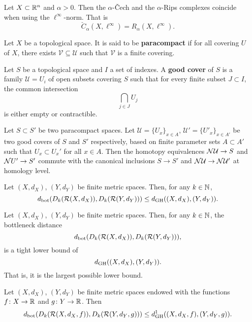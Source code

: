\begin{lemma}
    Let $ X \subset \mathbb R^n $ and $ \alpha > 0 $. Then the $\alpha$-\v Cech and the $\alpha$-Rips complexes coincide when using the $ \ell^\infty $-norm. That is
    $$
        \check C_\alpha(X, \ell^\infty) = R_\alpha(X, \ell^\infty).
    $$
\end{lemma}

\begin{definition}
    Let $ X $ be a topological space. It is said to be {\bf paracompact} if for all covering $ U $ of $ X $, there exists $ \mathcal V \subseteq \mathcal U $ such that $ \mathcal V $ is a finite covering.
\end{definition}

\begin{definition}
    Let $ S $ be a topological space and $ I $ a set of indexes. A {\bf good cover} of $ S $ is a family $ \mathcal U = {U_i} $ of open subsets covering $ S $ such that for every finite subset $ J \subset I $, the common intersection
    \begin{equation}
        \bigcap_{j\in J} U_j
    \end{equation}
    is either empty or contractible.
\end{definition}

\begin{lemma}
    Let $ S \subset S' $ be two paracompact spaces. Let $ \mathcal U = \{U_x\}_{x \in A}$, $ \mathcal U' = \{U'_x\}_{x \in A'}$ be two good covers of $ S $ and $ S'$ respectively, based on finite parameter sets $ A \subset A ' $ such that $ U_x \subset U_x' $ for all $ x \in A $. Then the homotopy equivalences $ \mathcal{N} \mathcal U \to S $ and $\mathcal{N} U' \to S' $ commute with the canonical inclusions $ S \to S' $ and $ \mathcal{N} \mathcal U \to \mathcal{N} \mathcal U' $ at homology level.
\end{lemma}

\begin{theorem}
    Let $ (X, d_X) $, $ (Y, d_Y) $ be finite metric spaces. Then, for any $ k \in \mathbb N$, 
    $$
        d_{\operatorname{bot}}(D_k(\mathcal{R}(X, d_X)), D_k(\mathcal{R}(Y, d_Y))) \leq d_{\operatorname{GH}}((X, d_X), (Y, d_Y)).
    $$
\end{theorem}

\begin{proposition}
    Let $ (X, d_X) $, $ (Y, d_Y) $ be finite metric spaces. Then, for any $ k \in \mathbb N$, the bottleneck distance
    $$
        d_{\operatorname{bot}}(D_k(\mathcal{R}(X, d_X)), D_k(\mathcal{R}(Y, d_Y))),
    $$
    is a tight lower bound of
    $$
        d_{\operatorname{GH}}((X, d_X), (Y, d_Y)).
    $$
    That is, it is the largest possible lower bound.
\end{proposition}

\begin{theorem}
    Let $ (X, d_X) $, $ (Y, d_Y) $ be finite metric spaces endowed with the functions $ f \colon X \to \mathbb R $ and $ g \colon Y \to \mathbb R $. Then
    $$
        d_{\operatorname{bot}}(D_k(\mathcal{R}(X, d_X, f)), D_k(\mathcal{R}(Y, d_Y, g))) \leq d_{\operatorname{GH}}^1((X, d_X, f), (Y, d_Y, g)).
    $$
\end{theorem}